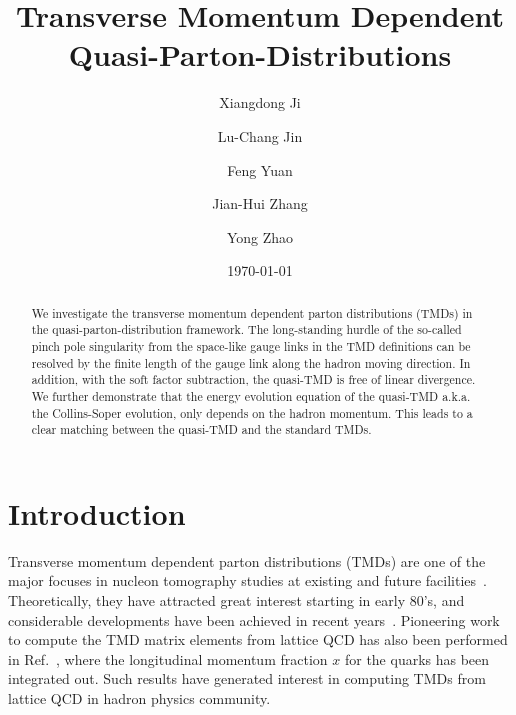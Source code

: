 \documentclass[aps,prd,preprint,tightenlines,superscriptaddress,nofootinbib]{revtex4}
\begin{document}

\title{Transverse Momentum Dependent Quasi-Parton-Distributions}

\author{Xiangdong Ji}

\author{Lu-Chang Jin}


\author{Feng Yuan}

\author{Jian-Hui Zhang}

\author{Yong Zhao}


\date{\today}
\vspace{0.5in}
\begin{abstract}
We investigate the transverse momentum dependent parton distributions (TMDs)
in the quasi-parton-distribution framework. The long-standing hurdle of the
so-called pinch pole singularity from the space-like gauge links in the TMD
definitions can be resolved by the finite length of the gauge link along the 
hadron moving direction. In addition, with the soft factor subtraction, the 
quasi-TMD is free of linear divergence. 
We further demonstrate that the energy evolution equation of the quasi-TMD
{{a.k.a.}} the Collins-Soper evolution, only depends on the hadron momentum. 
This leads to a clear matching between the quasi-TMD and the standard TMDs.
\end{abstract}

\maketitle

\section{Introduction}
Transverse momentum dependent parton distributions (TMDs) are one
of the major focuses in nucleon tomography studies at existing and
future facilities~\cite{Boer:2011fh}. Theoretically, they have attracted
great interest starting in early 80's, and considerable developments have been achieved
in recent years~\cite{Collins,Collins:1981uk,Ji:2004wu,bbdm}.
Pioneering work to 
compute the TMD matrix elements from lattice QCD has also been performed in 
Ref.~\cite{Musch:2010ka}, where the 
longitudinal momentum fraction $x$ for the quarks 
has been integrated out. Such results have generated
interest in computing TMDs from lattice QCD in hadron physics community. 
\end{document}
